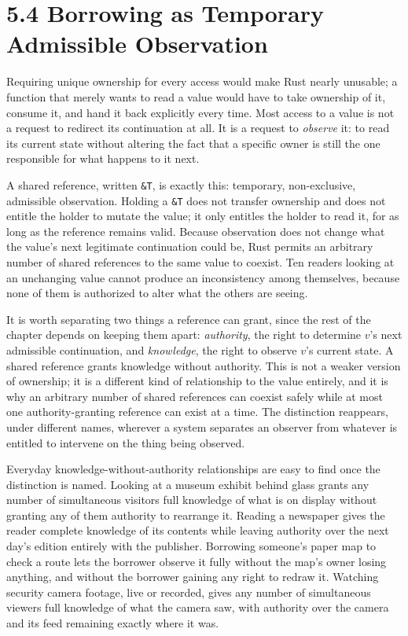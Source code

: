 \documentclass[11pt]{book}
\begin{document}
\section*{5.4 Borrowing as Temporary Admissible Observation}

Requiring unique ownership for every access would make Rust nearly unusable; a function that merely wants to read a value would have to take ownership of it, consume it, and hand it back explicitly every time. Most access to a value is not a request to redirect its continuation at all. It is a request to \emph{observe} it: to read its current state without altering the fact that a specific owner is still the one responsible for what happens to it next.

A shared reference, written \texttt{\&T}, is exactly this: temporary, non-exclusive, admissible observation. Holding a \texttt{\&T} does not transfer ownership and does not entitle the holder to mutate the value; it only entitles the holder to read it, for as long as the reference remains valid. Because observation does not change what the value's next legitimate continuation could be, Rust permits an arbitrary number of shared references to the same value to coexist. Ten readers looking at an unchanging value cannot produce an inconsistency among themselves, because none of them is authorized to alter what the others are seeing.

It is worth separating two things a reference can grant, since the rest of the chapter depends on keeping them apart: \emph{authority}, the right to determine $v$'s next admissible continuation, and \emph{knowledge}, the right to observe $v$'s current state. A shared reference grants knowledge without authority. This is not a weaker version of ownership; it is a different kind of relationship to the value entirely, and it is why an arbitrary number of shared references can coexist safely while at most one authority-granting reference can exist at a time. The distinction reappears, under different names, wherever a system separates an observer from whatever is entitled to intervene on the thing being observed.

Everyday knowledge-without-authority relationships are easy to find once the distinction is named. Looking at a museum exhibit behind glass grants any number of simultaneous visitors full knowledge of what is on display without granting any of them authority to rearrange it. Reading a newspaper gives the reader complete knowledge of its contents while leaving authority over the next day's edition entirely with the publisher. Borrowing someone's paper map to check a route lets the borrower observe it fully without the map's owner losing anything, and without the borrower gaining any right to redraw it. Watching security camera footage, live or recorded, gives any number of simultaneous viewers full knowledge of what the camera saw, with authority over the camera and its feed remaining exactly where it was.
\end{document}
